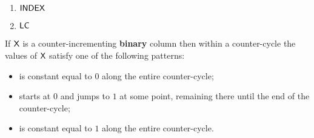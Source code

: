 \begin{multicols}{2}
    \begin{enumerate}
        \item $\textsf{INDEX}$
        \item $\textsf{LC}$
    \end{enumerate}
\end{multicols}
\saNote{} If $\textsf{X}$ is a counter-incrementing \textbf{binary} column then within a counter-cycle the values of $\textsf{X}$ satisfy one of the following patterns:
\begin{itemize}
    \item {} is constant equal to $0$ along the entire counter-cycle;
    \item {} starts at $0$ and jumps to $1$ at some point, remaining there until the end of the counter-cycle;
    \item {} is constant equal to $1$ along the entire counter-cycle.
\end{itemize}
